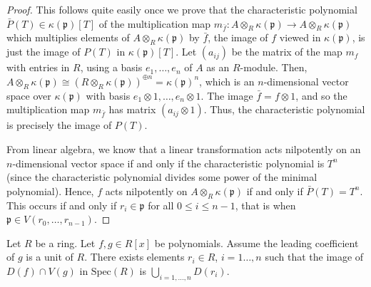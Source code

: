 \begin{proof}
This follows quite easily once we prove that the characteristic
polynomial $\bar P(T) \in \kappa(\mathfrak p)[T]$ of the
multiplication map $m_{\bar f}: A \otimes_R \kappa(\mathfrak p) \to
A \otimes_R \kappa(\mathfrak p)$ which multiplies elements of $A
\otimes_R \kappa(\mathfrak p)$ by $\bar f$, the image of $f$ viewed in
$\kappa(\mathfrak p)$, is just the image of $P(T)$ in
$\kappa(\mathfrak p)[T]$. Let $(a_{ij})$ be the matrix of the map
$m_f$ with entries in $R$, using a basis $e_1, \ldots, e_n$
of $A$ as an $R$-module.
Then, $A \otimes_R \kappa(\mathfrak p) \cong (R \otimes_R
\kappa(\mathfrak p))^{\oplus n} = \kappa(\mathfrak p)^n$, which is
an $n$-dimensional vector space over $\kappa(\mathfrak p)$ with
basis $e_1 \otimes 1, \ldots, e_n \otimes 1$. The image $\bar f = f
\otimes 1$, and so the multiplication map $m_{\bar f}$ has matrix
$(a_{ij} \otimes 1)$. Thus, the characteristic polynomial is
precisely the image of $P(T)$.

\medskip\noindent
From linear algebra, we know that a linear transformation acts
nilpotently on an $n$-dimensional vector space if and only if the
characteristic polynomial is $T^n$ (since the characteristic
polynomial divides some power of the minimal polynomial). Hence,
$f$ acts nilpotently on $A \otimes_R \kappa(\mathfrak p)$ if and
only if $\bar P(T) = T^n$. This occurs if and only if $r_i \in
\mathfrak p$ for all $0 \leq i \leq n - 1$, that is when $\mathfrak p \in
V(r_0, \ldots, r_{n - 1}).$
\end{proof}

\begin{lemma}
\label{lemma-affineline-special}
Let $R$ be a ring. Let $f, g \in R[x]$ be polynomials.
Assume the leading coefficient of $g$ is a unit of $R$.
There exists elements $r_i\in R$, $i = 1\ldots, n$ such that
the image of $D(f) \cap V(g)$ in $\text{Spec}(R)$ is
$\bigcup_{i = 1, \ldots, n} D(r_i)$.
\end{lemma}

